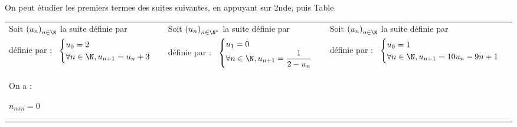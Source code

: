 On peut étudier les premiers termes des suites suivantes, en appuyant sur 2nde, puis Table. \\

\begin{tabular}{lll}

\hspace*{-2cm}

Soit $\left(u_n\right)_{n \in \N}$ la suite définie par &

\hspace*{-.6cm}

Soit $\left(u_n\right)_{n \in \N^*}$ la suite définie par &

\hspace*{-.3cm}

Soit $\left(u_n\right)_{n \in \N}$ la suite définie par \\

\hspace*{-2cm}

définie par :$ \; \; \; \begin{cases}
u_0 = 2 \\
\forall n \in \N, u_{n+1} = u_n + 3 \\
\end{cases}$ 

&

\hspace*{-.6cm}

définie par :$ \; \; \; \begin{cases}
u_1 = 0 \\
\forall n \in \N, u_{n+1} = \dfrac{1}{2 - u_n} \\
\end{cases}$ 

&

\hspace*{-.3cm}

définie par :$ \; \; \; \begin{cases}
u_0 = 1 \\
\forall n \in \N, u_{n+1} = 10u_n -9n + 1 \\
\end{cases}$ 

\vspace*{.5cm}

\\

\hspace*{-2cm}

On a :

$n_{min} = 0$ & 

\hspace*{-.6cm}


\end{tabular}
